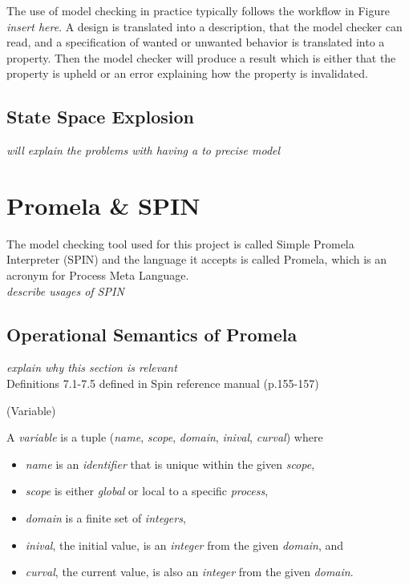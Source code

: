 
The use of model checking in practice typically follows the workflow in Figure \textit{insert here}. A design is translated into a description, that the model checker can read, and a specification of wanted or unwanted behavior is translated into a property. Then the model checker will produce a result which is either that the property is upheld or an error explaining how the property is invalidated. 

\subsection{State Space Explosion}

\textit{will explain the problems with having a to precise model}

\section{Promela \& SPIN}

The model checking tool used for this project is called Simple Promela Interpreter (SPIN) and the language it accepts is called Promela, which is an acronym for Process Meta Language. \\

\textit{describe usages of SPIN}

\subsection{Operational Semantics of Promela}

\textit{explain why this section is relevant} \\

Definitions 7.1-7.5 defined in Spin reference manual (p.155-157) \cite{spinreferencemanualbook}

\begin{definition}{}{}
\label{def:Variable}
(Variable) 

A \textit{variable} is a tuple (\textit{name}, \textit{scope}, \textit{domain}, \textit{inival}, \textit{curval}) where

\begin{itemize}
\item[] \textit{name} is an \textit{identifier} that is unique within the given \textit{scope},
\item[] \textit{scope} is either \textit{global} or local to a specific \textit{process},
\item[] \textit{domain} is a finite set of \textit{integers},
\item[] \textit{inival}, the initial value, is an \textit{integer} from the given \textit{domain}, and
\item[] \textit{curval}, the current value, is also an \textit{integer} from the given \textit{domain}.
\end{itemize}
\end{definition}

